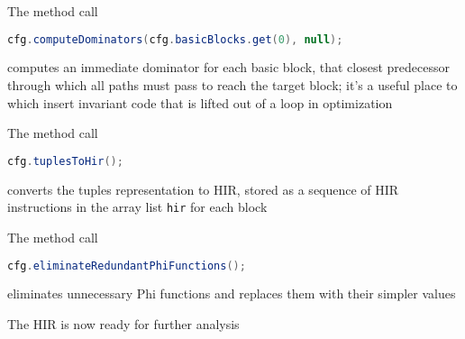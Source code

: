 \documentclass[8pt,a4paper,compress]{beamer}
\begin{document}
\begin{frame}[fragile]
\pause

The method call
\begin{lstlisting}[language=Java]
cfg.computeDominators(cfg.basicBlocks.get(0), null);
\end{lstlisting}
computes an immediate dominator for each basic block, that closest predecessor through which all paths must pass to reach the target block; it's a useful place to which insert invariant code that is lifted out of a loop in optimization

\pause
\bigskip

The method call
\begin{lstlisting}[language=Java]
cfg.tuplesToHir();
\end{lstlisting}
converts the tuples representation to HIR, stored as a sequence of HIR instructions in the array list \lstinline{hir} for each block

\pause
\bigskip

The method call
\begin{lstlisting}[language=Java]
cfg.eliminateRedundantPhiFunctions();
\end{lstlisting}
eliminates unnecessary Phi functions and replaces them with their simpler values

\pause
\bigskip

The HIR is now ready for further analysis
\end{frame}
\end{document}
